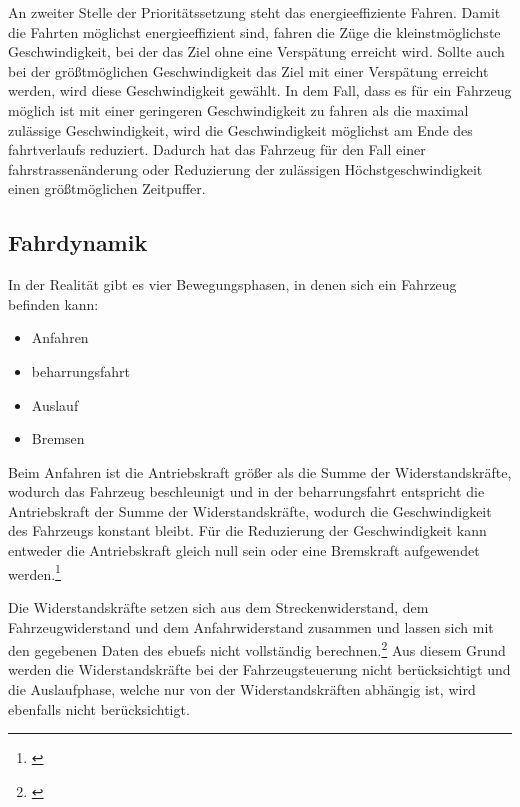 An zweiter Stelle der Prioritätssetzung steht das energieeffiziente Fahren. Damit die Fahrten möglichst energieeffizient sind, fahren die Züge die kleinstmöglichste Geschwindigkeit, bei der das Ziel ohne eine Verspätung erreicht wird. Sollte auch bei der größtmöglichen Geschwindigkeit das Ziel mit einer Verspätung erreicht werden, wird diese Geschwindigkeit gewählt. In dem Fall, dass es für ein Fahrzeug möglich ist mit einer geringeren Geschwindigkeit zu fahren als die maximal zulässige Geschwindigkeit, wird die Geschwindigkeit möglichst am Ende des \gls{fahrtverlauf}s reduziert. Dadurch hat das Fahrzeug für den Fall einer \gls{fahrstrasse}nänderung oder Reduzierung der zulässigen Höchstgeschwindigkeit einen größtmöglichen Zeitpuffer.
\subsection{Fahrdynamik}
In der Realität gibt es vier Bewegungsphasen, in denen sich ein Fahrzeug befinden kann:
\begin{itemize}
\item Anfahren
\item \Gls{beharrungsfahrt}
\item Auslauf
\item Bremsen
\end{itemize}
Beim Anfahren ist die Antriebskraft größer als die Summe der Widerstandskräfte, wodurch das Fahrzeug beschleunigt und in der \Gls{beharrungsfahrt} entspricht die Antriebskraft der Summe der Widerstandskräfte, wodurch die Geschwindigkeit des Fahrzeugs konstant bleibt. Für die Reduzierung der Geschwindigkeit kann entweder die Antriebskraft gleich null sein oder eine Bremskraft aufgewendet werden.\footnote{\citet[S. 23 ff.]{pachl1999systemtechnik}}

Die Widerstandskräfte setzen sich aus dem Streckenwiderstand, dem Fahrzeugwiderstand und dem Anfahrwiderstand zusammen und lassen sich mit den gegebenen Daten des \ac{ebuef}s nicht vollständig berechnen.\footnote{\citet[S. 25 ff.]{pachl1999systemtechnik}} Aus diesem Grund werden die Widerstandskräfte bei der Fahrzeugsteuerung nicht berücksichtigt und die Auslaufphase, welche nur von der Widerstandskräften abhängig ist, wird ebenfalls nicht berücksichtigt.

